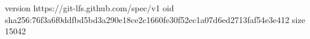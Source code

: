 version https://git-lfs.github.com/spec/v1
oid sha256:76f3a6f0ddfbd5bd3a290e18ce2c1660fe30f52ec1a07d6ed2713faf54e3e412
size 15042
